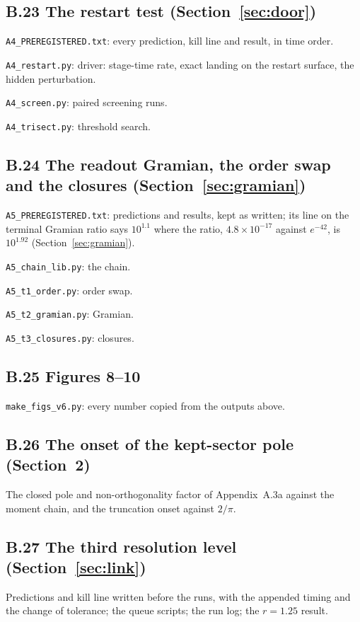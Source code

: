 \subsection*{B.23 The restart test (Section~\ref{sec:door})}
\noindent\texttt{A4\_PREREGISTERED.txt}: every prediction, kill line and result, in time order.

\noindent\texttt{A4\_restart.py}: driver: stage-time rate, exact landing on the restart surface, the hidden perturbation.

\noindent\texttt{A4\_screen.py}: paired screening runs.

\noindent\texttt{A4\_trisect.py}: threshold search.

\subsection*{B.24 The readout Gramian, the order swap and the closures (Section~\ref{sec:gramian})}
\noindent\texttt{A5\_PREREGISTERED.txt}: predictions and results, kept as written; its line on the terminal Gramian ratio says $10^{1.1}$ where the ratio, $4.8\times10^{-17}$ against $e^{-42}$, is $10^{1.92}$ (Section~\ref{sec:gramian}).

\noindent\texttt{A5\_chain\_lib.py}: the chain.

\noindent\texttt{A5\_t1\_order.py}: order swap.

\noindent\texttt{A5\_t2\_gramian.py}: Gramian.

\noindent\texttt{A5\_t3\_closures.py}: closures.

\subsection*{B.25 Figures 8--10}
\noindent\texttt{make\_figs\_v6.py}: every number copied from the outputs above.

\subsection*{B.26 The onset of the kept-sector pole (Section~2)}
The closed pole and non-orthogonality factor of Appendix~A.3a against the moment chain, and the truncation onset against $2/\pi$.



\subsection*{B.27 The third resolution level (Section~\ref{sec:link})}
Predictions and kill line written before the runs, with the appended timing and the change of tolerance; the queue scripts; the run log; the $r=1.25$ result.





